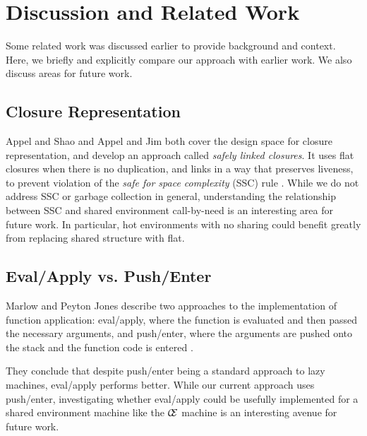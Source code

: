 \section{Discussion and Related Work} \label{sec:disc}

Some related work was discussed earlier to provide background and context. Here,
we briefly and explicitly compare our approach with earlier work. We also discuss
areas for future work.

\subsection{Closure Representation}
Appel and Shao \cite{shao1994space} and Appel and Jim \cite{appel1988optimizing}
both cover the design space for closure representation, and develop an approach
called \emph{safely linked closures}. It uses flat closures when
there is no duplication, and links in a way that preserves liveness, to prevent
violation of the \emph{safe for space complexity} (SSC) rule
\cite{appel1992compiling}. While we do not address SSC or garbage collection in
general, understanding the relationship between SSC and shared environment
call-by-need is an interesting area for future work. In particular, hot
environments with no sharing could benefit greatly from replacing shared
structure with flat.

\subsection{Eval/Apply vs. Push/Enter}
Marlow and Peyton Jones describe two approaches to the implementation of
function application: eval/apply, where the function is evaluated and then
passed the necessary arguments, and push/enter, where the arguments are pushed
onto the stack and the function code is entered \cite{marlow2006making}.

They conclude that despite push/enter being a standard approach to lazy
machines, eval/apply performs better. While our current approach uses
push/enter, investigating whether eval/apply could be usefully implemented for a
shared environment machine like the $\mathcal{\mathcal{C} \mskip -4mu
\mathcal{E}}$ machine is an interesting avenue for future work.

